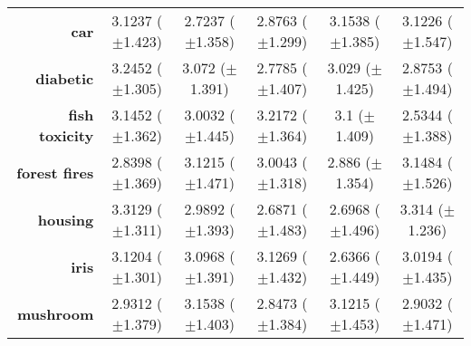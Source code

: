 \begin{table}[htb]
{\begin{tabular}{r|ccccc}
                  \textbf{car}                 & \cellcolor[rgb]{ 1,  .906,  .518}3.1237 ($\pm$1.423)    & \cellcolor[rgb]{ .388,  .745,  .482}2.7237 ($\pm$1.358) & \cellcolor[rgb]{ .62,  .812,  .494}2.8763 ($\pm$1.299)  & \cellcolor[rgb]{ .973,  .412,  .42}3.1538 ($\pm$1.385)  & \cellcolor[rgb]{ 1,  .922,  .518}3.1226 ($\pm$1.547)    \\
                  \textbf{diabetic}            & \cellcolor[rgb]{ .973,  .412,  .42}3.2452 ($\pm$1.305)  & \cellcolor[rgb]{ .996,  .824,  .502}3.072 ($\pm$1.391)  & \cellcolor[rgb]{ .388,  .745,  .482}2.7785 ($\pm$1.407) & \cellcolor[rgb]{ 1,  .922,  .518}3.029 ($\pm$1.425)     & \cellcolor[rgb]{ .624,  .812,  .494}2.8753 ($\pm$1.494) \\
                  \textbf{fish toxicity}       & \cellcolor[rgb]{ .992,  .725,  .482}3.1452 ($\pm$1.362) & \cellcolor[rgb]{ .894,  .89,  .51}3.0032 ($\pm$1.445)   & \cellcolor[rgb]{ .973,  .412,  .42}3.2172 ($\pm$1.364)  & \cellcolor[rgb]{ 1,  .922,  .518}3.1 ($\pm$1.409)       & \cellcolor[rgb]{ .388,  .745,  .482}2.5344 ($\pm$1.388) \\
                  \textbf{forest fires}        & \cellcolor[rgb]{ .388,  .745,  .482}2.8398 ($\pm$1.369) & \cellcolor[rgb]{ .98,  .51,  .439}3.1215 ($\pm$1.471)   & \cellcolor[rgb]{ 1,  .922,  .518}3.0043 ($\pm$1.318)    & \cellcolor[rgb]{ .557,  .792,  .49}2.886 ($\pm$1.354)   & \cellcolor[rgb]{ .973,  .412,  .42}3.1484 ($\pm$1.526)  \\
                  \textbf{housing}             & \cellcolor[rgb]{ .976,  .416,  .424}3.3129 ($\pm$1.311) & \cellcolor[rgb]{ 1,  .922,  .518}2.9892 ($\pm$1.393)    & \cellcolor[rgb]{ .388,  .745,  .482}2.6871 ($\pm$1.483) & \cellcolor[rgb]{ .404,  .749,  .482}2.6968 ($\pm$1.496) & \cellcolor[rgb]{ .973,  .412,  .42}3.314 ($\pm$1.236)   \\
                  \textbf{iris}                & \cellcolor[rgb]{ .98,  .522,  .443}3.1204 ($\pm$1.301)  & \cellcolor[rgb]{ 1,  .922,  .518}3.0968 ($\pm$1.391)    & \cellcolor[rgb]{ .973,  .412,  .42}3.1269 ($\pm$1.432)  & \cellcolor[rgb]{ .388,  .745,  .482}2.6366 ($\pm$1.449) & \cellcolor[rgb]{ .894,  .89,  .51}3.0194 ($\pm$1.435)   \\
                  \textbf{mushroom}            & \cellcolor[rgb]{ 1,  .922,  .518}2.9312 ($\pm$1.379)    & \cellcolor[rgb]{ .973,  .412,  .42}3.1538 ($\pm$1.403)  & \cellcolor[rgb]{ .388,  .745,  .482}2.8473 ($\pm$1.384) & \cellcolor[rgb]{ .98,  .486,  .435}3.1215 ($\pm$1.453)  & \cellcolor[rgb]{ .796,  .863,  .506}2.9032 ($\pm$1.471) \\

\end{tabular}}
\end{table}
